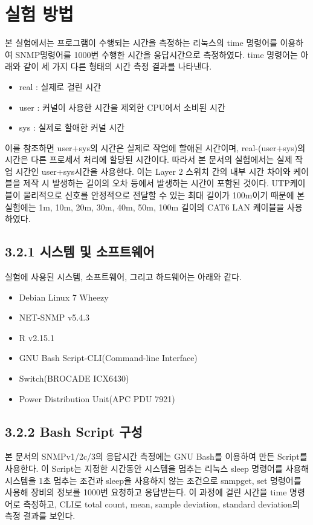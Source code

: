 \documentclass[11pt
  , a4paper
  , article
  , oneside
]{memoir}
\begin{document}
\section{실험 방법}
본 실험에서는 프로그램이 수행되는 시간을 측정하는 리눅스의 time 명령어를 이용하여 SNMP명령어를 1000번 수행한 시간을 응답시간으로 측정하였다. time 명령어는 아래와 같이 세 가지 다른 형태의 시간 측정 결과를 나타낸다\citep{time_command}. 
\begin{itemize}
\item real : 실제로 걸린 시간
\item user : 커널이 사용한 시간을 제외한 CPU에서 소비된 시간
\item sys : 실제로 할애한 커널 시간
\end{itemize}
이를 참조하면 user+sys의 시간은 실제로 작업에 할애된 시간이며, real-(user+sys)의 시간은 다른 프로세서 처리에 할당된 시간이다. 따라서 본 문서의 실험에서는 실제 작업 시간인 user+sys시간을 사용한다. 이는 Layer 2 스위치 간의 내부 시간 차이와 케이블을 제작 시 발생하는 길이의 오차 등에서 발생하는 시간이 포함된 것이다. UTP케이블이 물리적으로 신호를 안정적으로 전달할 수 있는 최대 길이가 100m이기 때문에 본 실험에는 1m, 10m, 20m, 30m, 40m, 50m, 100m 길이의 CAT6 LAN 케이블을 사용하였다.

\subsection{3.2.1 시스템 및 소프트웨어}
실험에 사용된 시스템, 소프트웨어, 그리고 하드웨어는 아래와 같다.

\begin{itemize}
\item Debian Linux 7 Wheezy
\item NET-SNMP v5.4.3
\item R v2.15.1
\item GNU Bash Script-CLI(Command-line Interface) 
\item Switch(BROCADE ICX6430)
\item Power Distribution Unit(APC PDU 7921)
\end{itemize}

\subsection{3.2.2 Bash Script 구성}
본 문서의 SNMPv1/2c/3의 응답시간 측정에는 GNU Bash를 이용하여 만든 Script를 사용한다. 이 Script는 지정한 시간동안 시스템을 멈추는 리눅스 sleep 명령어를 사용해 시스템을 1초 멈추는 조건과 sleep을 사용하지 않는 조건으로 snmpget, set 명령어를 사용해 장비의 정보를 1000번 요청하고 응답받는다. 이 과정에 걸린 시간을 time 명령어로 측정하고, CLI로 total count, mean, sample deviation, standard deviation의 측정 결과를 보인다.
\end{document}
